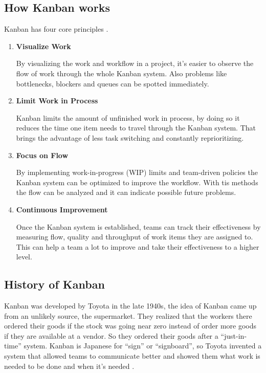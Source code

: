\subsection{How Kanban works}
Kanban has four core principles \cite{WhatIsKanban}.
\begin{enumerate}
    \item \textbf{Visualize Work}

    By visualizing the work and workflow in a project, it's easier to observe the flow of work through the whole Kanban system. Also problems like bottlenecks, blockers and queues can be spotted immediately.

    \item \textbf{Limit Work in Process}

    Kanban limits the amount of unfinished work in process, by doing so it reduces the time one item needs to travel through the Kanban system. That brings the advantage of less task switching and constantly reprioritizing.

    \item \textbf{Focus on Flow}

    By implementing work-in-progress (WIP) limits and team-driven policies the Kanban system can be optimized to improve the workflow. With tis methods the flow can be analyzed and it can indicate possible future problems.

    \item \textbf{Continuous Improvement}

    Once the Kanban system is established, teams can track their effectiveness by measuring flow, quality and throughput of work items they are assigned to. This can help a team a lot to improve and take their effectiveness to a higher level.
\end{enumerate}

\subsection{History of Kanban}
Kanban was developed by Toyota in the late 1940s, the idea of Kanban came up from an unlikely source, the supermarket. They realized that the workers there ordered their goods if the stock was going near zero instead of order more goods if they are available at a vendor. So they ordered their goods after a ``just-in-time'' system. Kanban is Japanese for ``sign'' or ``signboard'', so Toyota invented a system that allowed teams to communicate better and showed them what work is needed to be done and when it's needed \cite{WhatIsKanban}.

